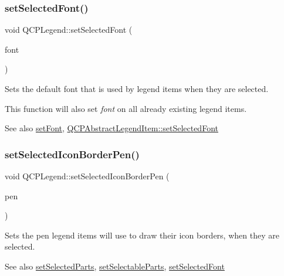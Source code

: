 \subsubsection{\texorpdfstring{set\+Selected\+Font()}{setSelectedFont()}}
{\footnotesize\ttfamily void Q\+C\+P\+Legend\+::set\+Selected\+Font (\begin{DoxyParamCaption}\item[{const Q\+Font \&}]{font }\end{DoxyParamCaption})}

Sets the default font that is used by legend items when they are selected.

This function will also set {\itshape font} on all already existing legend items.

\begin{DoxySeeAlso}{See also}
\hyperlink{class_q_c_p_legend_aa4cda8499e3cb0f3be415edc02984c73}{set\+Font}, \hyperlink{class_q_c_p_abstract_legend_item_a91db5aee48617a9d3206e61376807365}{Q\+C\+P\+Abstract\+Legend\+Item\+::set\+Selected\+Font} 
\end{DoxySeeAlso}
\hypertarget{class_q_c_p_legend_ade93aabe9bcccaf9cf46cec22c658027}{}\label{class_q_c_p_legend_ade93aabe9bcccaf9cf46cec22c658027} 
\subsubsection{\texorpdfstring{set\+Selected\+Icon\+Border\+Pen()}{setSelectedIconBorderPen()}}
{\footnotesize\ttfamily void Q\+C\+P\+Legend\+::set\+Selected\+Icon\+Border\+Pen (\begin{DoxyParamCaption}\item[{const Q\+Pen \&}]{pen }\end{DoxyParamCaption})}

Sets the pen legend items will use to draw their icon borders, when they are selected.

\begin{DoxySeeAlso}{See also}
\hyperlink{class_q_c_p_legend_a2aee309bb5c2a794b1987f3fc97f8ad8}{set\+Selected\+Parts}, \hyperlink{class_q_c_p_legend_a9ce60aa8bbd89f62ae4fa83ac6c60110}{set\+Selectable\+Parts}, \hyperlink{class_q_c_p_legend_ab580a01c3c0a239374ed66c29edf5ad2}{set\+Selected\+Font} 
\end{DoxySeeAlso}
\hypertarget{class_q_c_p_legend_a2aee309bb5c2a794b1987f3fc97f8ad8}{}\label{class_q_c_p_legend_a2aee309bb5c2a794b1987f3fc97f8ad8} 
